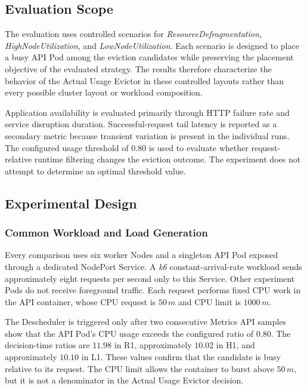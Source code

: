\subsection{Evaluation Scope}
\label{subsec:actualusage4_scope}
The evaluation uses controlled scenarios for \textit{ResourceDefragmentation}, \textit{HighNodeUtilization}, and \textit{LowNodeUtilization}. Each scenario is designed to place a busy API Pod among the eviction candidates while preserving the placement objective of the evaluated strategy. The results therefore characterize the behavior of the Actual Usage Evictor in these controlled layouts rather than every possible cluster layout or workload composition.

Application availability is evaluated primarily through HTTP failure rate and service disruption duration. Successful-request tail latency is reported as a secondary metric because transient variation is present in the individual runs. The configured usage threshold of \(0.80\) is used to evaluate whether request-relative runtime filtering changes the eviction outcome. The experiment does not attempt to determine an optimal threshold value.

\subsection{Experimental Design}
\label{subsec:actualusage4_experimentsetup}
\subsubsection{Common Workload and Load Generation}
\label{subsubsec:actualusage4_load}

Every comparison uses six worker Nodes and a singleton API Pod exposed through a dedicated NodePort Service. A \textit{k6} constant-arrival-rate workload sends approximately eight requests per second only to this Service. Other experiment Pods do not receive foreground traffic. Each request performs fixed CPU work in the API container, whose CPU request is \(50\,m\) and CPU limit is \(1000\,m\).

The Descheduler is triggered only after two consecutive Metrics API samples show that the API Pod's CPU usage exceeds the configured ratio of \(0.80\). The decision-time ratios are \(11.98\) in R1, approximately \(10.02\) in H1, and approximately \(10.10\) in L1. These values confirm that the candidate is busy relative to its request. The CPU limit allows the container to burst above \(50\,m\), but it is not a denominator in the Actual Usage Evictor decision.

